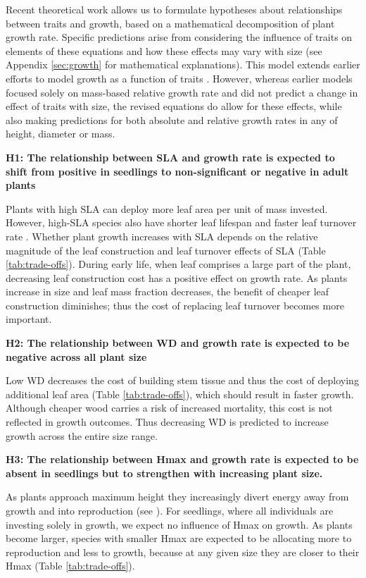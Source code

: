 \documentclass[a4paper,11pt]{article}
\begin{document}
Recent theoretical work \citep{Falster:2011ii} allows us to formulate hypotheses about relationships between traits and growth, based on a mathematical decomposition of plant growth rate. Specific predictions arise from considering the influence of traits on elements of these equations and how these effects may vary with size (see Appendix \ref{sec:growth} for mathematical explanations). This model extends earlier efforts to model growth as a function of traits \citep{Lambers:1992bj,cornelissen_seedling_1996,Wright:2000kw,Enquist:2007ek}. However, whereas earlier models focused solely on mass-based relative growth rate and did not predict a change in effect of traits with size, the revised equations do allow for these effects, while also making predictions for both absolute and relative growth rates in any of height, diameter or mass.

\textbf{H1: The relationship between SLA and growth rate is expected to shift from positive in seedlings to non-significant or negative in adult plants}

Plants with high SLA can deploy more leaf area per unit of mass invested. However, high-SLA species also have shorter leaf lifespan and faster leaf turnover rate \citep{Wright:2004jb}. Whether plant growth increases with SLA depends on the relative magnitude of the leaf construction and leaf turnover effects of SLA (Table \ref{tab:trade-offs}). During early life, when leaf comprises a large part of the plant, decreasing leaf construction cost has a positive effect on growth rate. As plants increase in size and leaf mass fraction decreases, the benefit of cheaper leaf construction diminishes; thus the cost of replacing leaf turnover becomes more important.

\textbf{H2: The relationship between WD and growth rate is expected to be negative across all plant size}

Low WD decreases the cost of building stem tissue and thus the cost of deploying additional leaf area (Table \ref{tab:trade-offs}), which should result in faster growth. Although cheaper wood carries a risk of increased mortality, this cost is not reflected in growth outcomes. Thus decreasing WD is predicted to increase growth across the entire size range.

\textbf{H3: The relationship between Hmax and growth rate is expected to be absent in seedlings but to strengthen with increasing plant size.}

As plants approach maximum height they increasingly divert energy away from growth and into reproduction (see \citealt{Thomas:1996do,Thomas-2011, Wenk:2014jz}). For seedlings, where all individuals are investing solely in growth, we expect no influence of Hmax on growth. As plants become larger, species with smaller Hmax are expected to be allocating more to reproduction and less to growth, because at any given size they are closer to their Hmax (Table \ref{tab:trade-offs}).
\end{document}
